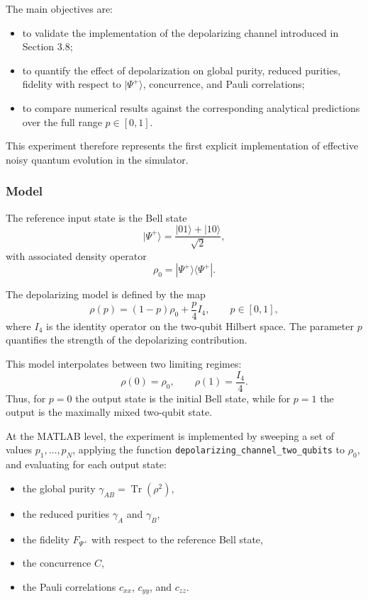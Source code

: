 \documentclass[a4paper]{article}
\begin{document}
The main objectives are:
\begin{itemize}
    \item to validate the implementation of the depolarizing channel introduced in Section 3.8;
    \item to quantify the effect of depolarization on global purity, reduced purities, fidelity with respect to \(|\Psi^+\rangle\), concurrence, and Pauli correlations;
    \item to compare numerical results against the corresponding analytical predictions over the full range \(p \in [0,1]\).
\end{itemize}

This experiment therefore represents the first explicit implementation of effective noisy quantum evolution in the simulator.

\subsubsection{Model}

The reference input state is the Bell state
\[
|\Psi^+\rangle = \frac{|01\rangle + |10\rangle}{\sqrt{2}},
\]
with associated density operator
\[
\rho_0 = |\Psi^+\rangle\langle\Psi^+|.
\]

The depolarizing model is defined by the map
\[
\rho(p) = (1-p)\rho_0 + \frac{p}{4}I_4,
\qquad p \in [0,1],
\]
where \(I_4\) is the identity operator on the two-qubit Hilbert space. The parameter \(p\) quantifies the strength of the depolarizing contribution.

This model interpolates between two limiting regimes:
\[
\rho(0)=\rho_0,
\qquad
\rho(1)=\frac{I_4}{4}.
\]
Thus, for \(p=0\) the output state is the initial Bell state, while for \(p=1\) the output is the maximally mixed two-qubit state.

At the MATLAB level, the experiment is implemented by sweeping a set of values \(p_1,\dots,p_N\), applying the function \texttt{depolarizing\_channel\_two\_qubits} to \(\rho_0\), and evaluating for each output state:
\begin{itemize}
    \item the global purity \(\gamma_{AB} = \operatorname{Tr}(\rho^2)\),
    \item the reduced purities \(\gamma_A\) and \(\gamma_B\),
    \item the fidelity \(F_{\Psi^+}\) with respect to the reference Bell state,
    \item the concurrence \(C\),
    \item the Pauli correlations \(c_{xx}\), \(c_{yy}\), and \(c_{zz}\).
\end{itemize}
\end{document}
